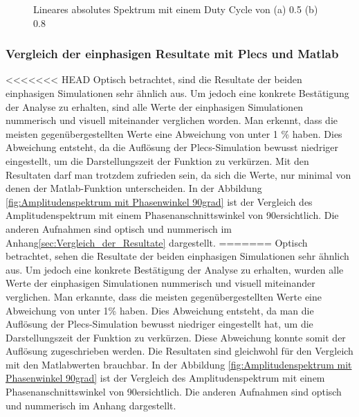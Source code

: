 \begin{figure}[ht!]
	\centering
	\qquad
	\caption{Lineares absolutes Spektrum mit einem Duty Cycle von (a) 0.5 (b) 0.8}
	\label{fig:plecs_Schwingungspakete_absolut log}
\end{figure}

\subsubsection{Vergleich der einphasigen Resultate mit Plecs und Matlab}

<<<<<<< HEAD
Optisch betrachtet, sind die Resultate der beiden einphasigen Simulationen sehr ähnlich aus. Um jedoch eine konkrete Bestätigung der Analyse zu erhalten, sind alle Werte der einphasigen Simulationen nummerisch und visuell miteinander verglichen worden. Man erkennt, dass die meisten gegenübergestellten Werte eine Abweichung von unter 1 \% haben. Dies Abweichung entsteht, da die Auflösung der Plecs-Simulation bewusst niedriger eingestellt, um die Darstellungszeit der Funktion zu verkürzen. Mit den Resultaten darf man trotzdem zufrieden sein, da sich die Werte, nur minimal von denen der Matlab-Funktion unterscheiden. In der Abbildung \ref{fig:Amplitudenspektrum mit Phasenwinkel 90grad} ist der Vergleich des Amplitudenspektrum mit einem Phasenanschnittswinkel von 90\textdegree ersichtlich. Die anderen Aufnahmen sind optisch und nummerisch im Anhang\ref{sec:Vergleich_der_Resultate} dargestellt.
=======
Optisch betrachtet, sehen die Resultate der beiden einphasigen Simulationen sehr ähnlich aus. Um jedoch eine konkrete Bestätigung der Analyse zu erhalten, wurden alle Werte der einphasigen Simulationen nummerisch und visuell miteinander verglichen. Man erkannte, dass die meisten gegenübergestellten Werte eine Abweichung von unter 1\% haben. Dies Abweichung entsteht, da man die Auflösung der Plecs-Simulation bewusst niedriger eingestellt hat, um die Darstellungszeit der Funktion zu verkürzen. Diese Abweichung konnte somit der Auflösung zugeschrieben werden. Die Resultaten sind gleichwohl für den Vergleich mit den Matlabwerten brauchbar. In der Abbildung \ref{fig:Amplitudenspektrum mit Phasenwinkel 90grad} ist der Vergleich des Amplitudenspektrum mit einem Phasenanschnittswinkel von 90\textdegree ersichtlich. Die anderen Aufnahmen sind optisch und nummerisch im Anhang dargestellt.

